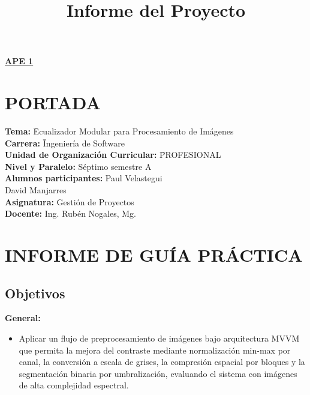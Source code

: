 \documentclass[11pt]{article}
\title{Informe del Proyecto}
\begin{document}
\renewcommand{\thesection}{\Roman{section}}
\begin{center}
    \textbf{\underline{\normalsize APE 1}}
\end{center}

\section{PORTADA}

\begin{tabbing}
    \textbf{Tema:}\hspace{1cm} \= Ecualizador Modular para Procesamiento de Imágenes \\[0.25em]
    \textbf{Carrera:}\hspace{1cm} \= Ingeniería de Software \\[0.25em]
    \textbf{Unidad de Organización Curricular:} \hspace{1cm} \= PROFESIONAL \\[0.25em]
    \textbf{Nivel y Paralelo:} \> Séptimo semestre A \\[0.25em]
    \textbf{Alumnos participantes:} \> Paul Velastegui \\
    \> David Manjarres \\[0.25em]
    \textbf{Asignatura:} \> Gestión de Proyectos \\[0.25em]
    \textbf{Docente:} \> Ing. Rubén Nogales, Mg.
\end{tabbing}

\section{INFORME DE GUÍA PRÁCTICA}
\renewcommand{\thesection}{\arabic{section}}

\subsection{Objetivos}
\textbf{General:}
\begin{itemize}
    \item Aplicar un flujo de preprocesamiento de imágenes bajo arquitectura MVVM que permita la mejora del contraste mediante normalización min-max por canal, la conversión a escala de grises, la compresión espacial por bloques y la segmentación binaria por umbralización, evaluando el sistema con imágenes de alta complejidad espectral.
\end{itemize}
\end{document}
